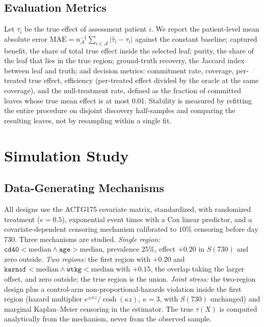 \documentclass[conference]{IEEEtran}
\begin{document}
\subsection{Evaluation Metrics}

Let $\tau_{i}$ be the true effect of assessment patient $i$. We report the
patient-level mean absolute error
$\mathrm{MAE}=n_{\mathcal{A}}^{-1}\sum_{i\in\mathcal{A}}|\hat\tau_{i}-\tau_{i}|$
against the constant baseline; captured benefit, the share of total true effect
inside the selected leaf; purity, the share of the leaf that lies in the true
region; ground-truth recovery, the Jaccard index between leaf and truth; and
decision metrics: commitment rate, coverage, per-treated true effect,
efficiency (per-treated effect divided by the oracle at the same coverage), and
the null-treatment rate, defined as the fraction of committed leaves whose true
mean effect is at most 0.01. Stability is measured by refitting the entire
procedure on disjoint discovery half-samples and comparing the resulting
leaves, not by resampling within a single fit.

\section{Simulation Study}

\subsection{Data-Generating Mechanisms}

All designs use the ACTG175 covariate matrix, standardized, with randomized
treatment ($e=0.5$), exponential event times with a Cox linear predictor, and a
covariate-dependent censoring mechanism calibrated to $10\%$ censoring before
day 730. Three mechanisms are studied. \emph{Single region:}
$\texttt{cd40}<\mathrm{median}\wedge\texttt{age}>\mathrm{median}$, prevalence
$25\%$, effect $+0.20$ in $S(730)$ and zero outside. \emph{Two regions:} the
first region with $+0.20$ and
$\texttt{karnof}<\mathrm{median}\wedge\texttt{wtkg}<\mathrm{median}$ with
$+0.15$, the overlap taking the larger offset, and zero outside; the true
region is the union. \emph{Joint stress:} the two-region design plus a
control-arm non-proportional-hazards violation inside the first region
(hazard multiplier $e^{\pm\kappa z}/\cosh(\kappa z)$, $\kappa=3$, with $S(730)$
unchanged) and marginal Kaplan--Meier censoring in the estimator. The true
$\tau(X)$ is computed analytically from the mechanism, never from the observed
sample.
\end{document}
